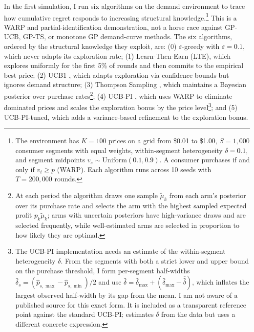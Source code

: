 In the first simulation, I run six algorithms on the \citet{Misra2019} demand environment to trace how cumulative regret responds to increasing structural knowledge.\footnote{The environment has $K = 100$ prices on a grid from \$0.01 to \$1.00, $S = 1{,}000$ consumer segments with equal weights, within-segment heterogeneity $\delta = 0.1$, and segment midpoints $v_s \sim \mathrm{Uniform}(0.1, 0.9)$. A consumer purchases if and only if $v_i \geq p$ (WARP). Each algorithm runs across 10 seeds with $T = 200{,}000$ rounds.} This is a WARP and partial-identification demonstration, not a horse race against GP-UCB, GP-TS, or monotone GP demand-curve methods. The six algorithms, ordered by the structural knowledge they exploit, are: (0) $\varepsilon$-greedy with $\varepsilon = 0.1$, which never adapts its exploration rate; (1) Learn-Then-Earn (LTE), which explores uniformly for the first 5\% of rounds and then commits to the empirical best price; (2) UCB1 \citep{auer2002}, which adapts exploration via confidence bounds but ignores demand structure; (3) Thompson Sampling \citep{Thompson1933}, which maintains a Bayesian posterior over purchase rates\footnote{At each period the algorithm draws one sample $\tilde{\mu}_k$ from each arm's posterior over its purchase rate and selects the arm with the highest sampled expected profit $p_k \tilde{\mu}_k$; arms with uncertain posteriors have high-variance draws and are selected frequently, while well-estimated arms are selected in proportion to how likely they are optimal.}; (4) UCB-PI \citep{Misra2019}, which uses WARP to eliminate dominated prices and scales the exploration bonus by the price level\footnote{The UCB-PI implementation needs an estimate of the within-segment heterogeneity $\delta$. From the segments with both a strict lower and upper bound on the purchase threshold, I form per-segment half-widths $\hat{\delta}_s = (\hat{p}_{s,\max} - \hat{p}_{s,\min})/2$ and use $\hat{\delta} = \hat{\delta}_{\max} + (\hat{\delta}_{\max} - \overline{\hat{\delta}})$, which inflates the largest observed half-width by its gap from the mean. I am not aware of a published source for this exact form. It is included as a transparent reference point against the standard UCB-PI; \citet{Misra2019} estimates $\delta$ from the data but uses a different concrete expression.}; and (5) UCB-PI-tuned, which adds a variance-based refinement to the exploration bonus.

